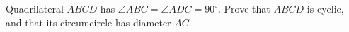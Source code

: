 Quadrilateral $ABCD$ has $\angle ABC=\angle ADC=90^\circ$. Prove that $ABCD$ is cyclic, and that its circumcircle has diameter $AC$.
